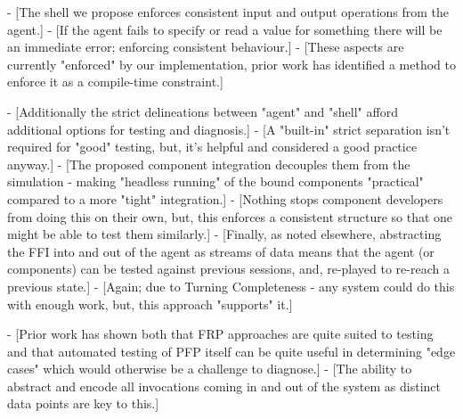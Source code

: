 - [The shell we propose enforces consistent input and output operations from the agent.]
    - [If the agent fails to specify or read a value for something there will be an immediate error; enforcing consistent behaviour.]
- [These aspects are currently "enforced" by our implementation, prior work has identified a method to enforce it as a compile-time constraint.\cite{winograd2012wormholes}]

- [Additionally the strict delineations between "agent" and "shell" afford additional options for testing and diagnosis.]
    - [A "built-in" strict separation isn't required for "good" testing, but, it's helpful and considered a good practice anyway.]
- [The proposed component integration decouples them from the simulation - making "headless running" of the bound components "practical" compared to a more "tight" integration.]
    - [Nothing stops component developers from doing this on their own, but, this enforces a consistent structure so that one might be able to test them similarly.]
- [Finally, as noted elsewhere, abstracting the FFI into and out of the agent as streams of data means that the agent (or components) can be tested against previous sessions, and, re-played to re-reach a previous state.]
    - [Again; due to Turning Completeness - any system could do this with enough work, but, this approach "supports" it.]

- [Prior work has shown both that FRP approaches are quite suited to testing\cite{perez2017testing} and that automated testing of PFP itself can be quite useful in determining "edge cases"\cite{claessen2011quickcheck} which would otherwise be a challenge to diagnose.]
	- [The ability to abstract and encode all invocations coming in and out of the system as distinct data points are key to this.]